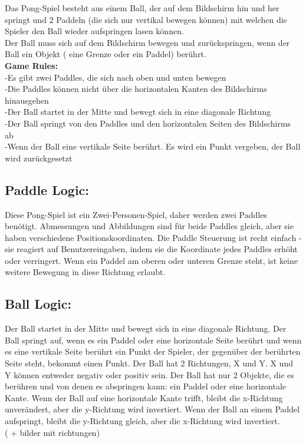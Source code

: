\documentclass[a4paper, 11pt]{article}
\begin{document}
    Das Pong-Spiel besteht aus einem Ball, der auf dem Bildschirm hin und her springt und 2 Paddeln (die sich nur vertikal bewegen können) mit welchen die Spieler den Ball wieder aufspringen lasen können.
    \\Der Ball muss sich auf dem Bildschirm bewegen und zurückspringen, wenn der Ball ein Objekt ( eine Grenze oder ein Paddel) berührt.
    \\\textbf{Game Rules:}   \\-Es gibt zwei Paddles, die sich nach oben und unten bewegen
                    \\-Die Paddles können nicht über die horizontalen Kanten des Bildschirms hinausgehen
                    \\-Der Ball startet in der Mitte und bewegt sich in eine diagonale Richtung
                    \\-Der Ball springt von den Paddles und den horizontalen Seiten des Bildschirms ab
                    \\-Wenn der Ball eine vertikale Seite berührt. Es wird ein Punkt vergeben, der Ball wird zurückgesetzt
\subsection{Paddle Logic:}
    Diese Pong-Spiel ist ein Zwei-Personen-Spiel, daher werden zwei Paddles benötigt.   Abmessungen und Abbildungen sind für beide Paddles gleich, aber sie haben verschiedene Positionskoordinaten. Die Paddle Steuerung ist recht einfach - sie reagiert auf Benutzereingaben, indem sie die Koordinate jedes Paddles erhöht oder verringert. Wenn ein Paddel am oberen oder unteren Grenze steht, ist keine weitere Bewegung in diese Richtung erlaubt.

\subsection{Ball Logic:}
    Der Ball startet in der Mitte und bewegt sich in eine diagonale Richtung. Der Ball springt auf, wenn es ein Paddel oder eine horizontale Seite berührt und wenn es eine vertikale Seite berührt ein Punkt der Spieler, der gegenüber der berührten Seite steht, bekommt einen Punkt.
    Der Ball hat 2 Richtungen, X und Y. X und Y können entweder negativ oder positiv sein. Der Ball hat nur 2 Objekte, die es berühren und von denen es abspringen kann: ein Paddel oder eine horizontale Kante. Wenn der Ball auf eine horizontale Kante trifft, bleibt die x-Richtung unverändert, aber die y-Richtung wird invertiert. Wenn der Ball an einem Paddel aufspringt, bleibt die y-Richtung gleich, aber die x-Richtung wird invertiert.
    \\ ( + bilder mit richtungen)
    
\end{document}

